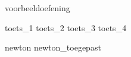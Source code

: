 %
%
%
%
%
%
%
%
%
%
%
%
%


{voorbeeldoefening}
\newpage

{toets_1}
{toets_2}
{toets_3}
{toets_4}


{newton}
{newton_toegepast}









% 


